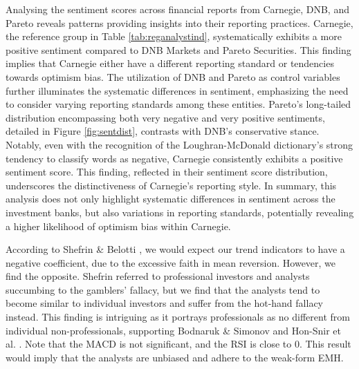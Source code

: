 Analysing the sentiment scores across financial reports from Carnegie, DNB, and Pareto reveals patterns providing insights into their reporting practices. Carnegie, the reference group in Table \ref{tab:reganalystind}, systematically exhibits a more positive sentiment compared to DNB Markets and Pareto Securities. This finding implies that Carnegie either have a different reporting standard or tendencies towards optimism bias. The utilization of DNB and Pareto as control variables further illuminates the systematic differences in sentiment, emphasizing the need to consider varying reporting standards among these entities. %
Pareto's long-tailed distribution encompassing both very negative and very positive sentiments, detailed in Figure \ref{fig:sentdist}, contrasts with DNB's conservative stance. Notably, even with the recognition of the Loughran-McDonald dictionary's strong tendency to classify words as negative, Carnegie consistently exhibits a positive sentiment score. This finding, reflected in their sentiment score distribution, underscores the distinctiveness of Carnegie's reporting style. In summary, this analysis does not only highlight systematic differences in sentiment across the investment banks, but also variations in reporting standards, potentially revealing a higher likelihood of optimism bias within Carnegie.


According to Shefrin \& Belotti \parencite*{shefrin2007behavioral}, we would expect our trend indicators to have a negative coefficient, due to the excessive faith in mean reversion. However, we find the opposite. Shefrin referred to professional investors and analysts succumbing to the gamblers' fallacy, but we find that the analysts tend to become similar to individual investors and suffer from the hot-hand fallacy instead. This finding is intriguing as it portrays professionals as no different from individual non-professionals, supporting Bodnaruk \& Simonov \parencite*{bodnaruk2015financial} and Hon-Snir et al. \parencite*{hon2012stock}. Note that the MACD is not significant, and the RSI is close to 0. This result would imply that the analysts are unbiased and adhere to the weak-form EMH. 

